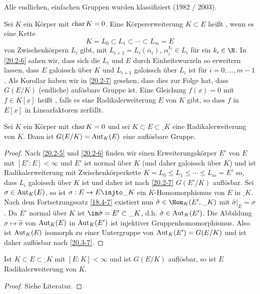 Alle endlichen, einfachen Gruppen wurden klassifiziert (1982 / 2003).

Sei $K$ ein Körper mit $\operatorname{char} K = 0$.
Eine Körpererweiterung $K \subset E$ heißt , wenn es eine Kette
\[
	K = L_0 \subset L_1 \subset \dotsb \subset L_m = E
\]
von Zwischenkörpern $L_i$ gibt, mit $L_{i+1} = L_i(\alpha_i)$, $\alpha_i^{k_i} \in L_i$ für ein $k_i \in \N$.
In \ref{20.2-6} sahen wir, dass sich die $L_i$ und $E$ durch Einheitswurzeln so erweitern lassen, dass $E$ galoissch über $K$ und $L_{i+1}$ galoissch über $L_i$ ist für $i = 0, \dotsc, m-1$.
Als Korollar haben wir in \ref{20.2-7} gesehen, dass dies zur Folge hat, dass $G(E / K)$ (endliche) aufösbare Gruppe ist.
Eine Gleichung $f(x) = 0$ mit $f \in K[x]$ heißt , falls es eine Radikalerweiterung $E$ von $K$ gibt, so dass $f$ in $E[x]$ in Linearfaktoren zerfällt.

\begin{st} \label{20.3-9}
	Sei $K$ ein Körper mit $\operatorname{char} K = 0$ und sei $K \subset E \subset \_K$ eine Radikalerweiterung von $K$.
	Dann ist $G(E/K) = \operatorname{Aut}_K(E)$ eine auflösbare Gruppe.
	\begin{proof}
		Nach \ref{20.2-5} und \ref{20.2-6} finden wir einen Erweiterungskörper $E'$ von $E$ mit $[E' : E] < \infty$ und $E'$ ist normal über $K$ (und daher galoissch über $K$) und ist Radikalerweiterung mit Zwischenkörperkette $K = L_0 \le L_1 \le \dotsb \le L_m = E'$ so, dass $L_i$ galoissch über $K$ ist und daher ist nach \ref{20.2-7} $G(E' / K)$ auflösbar.
		Sei $\sigma \in \operatorname{Aut}_K(E)$, so ist $\sigma: E \to E \injto \_K$ ein $K$-Homomorphismus von $E$ in $\_K$.
		Nach dem Fortsetzungssatz \ref{18.4-7} existiert nun $\hat \sigma \in \Hom_K(E', \_K)$ mit $\hat \sigma|_E = \sigma$.
		Da $E'$ normal über $K$ ist $\im \hat \sigma = E' \subset \_K$, d.h. $\hat \sigma \in \operatorname{Aut}_K(E')$.
		Die Abbildung $\sigma \mapsto \hat \sigma$ von $\operatorname{Aut}_K(E)$ in $\operatorname{Aut}_K(E')$ ist injektiver Gruppenhomomorphismus.
		Also ist $\operatorname{Aut}_K(E)$ isomorph zu einer Untergruppe von $\operatorname{Aut}_K(E') = G(E / K)$ und ist daher auflösbar nach \ref{20.3-7}.
	\end{proof}
\end{st}

\begin{nt} \label{20.3-10}
	Ist $K \subset E \subset \_K$ mit $[E : K] < \infty$ und ist $G(E / K)$ auflösbar, so ist $E$ Radikalerweiterung von $K$.
	\begin{proof}
		Siehe Literatur.
	\end{proof}
\end{nt}

